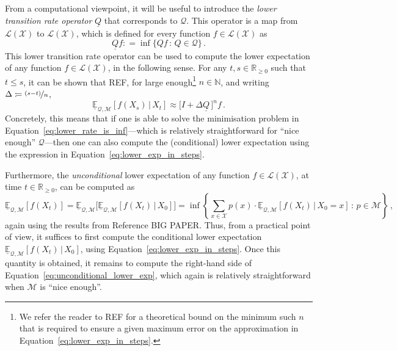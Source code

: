 \documentclass[twoside,11pt]{article}
\newcommand{\nats}{\mathbb{N}}
\newcommand{\reals}{\mathbb{R}}
\newcommand{\realsnonneg}{\reals_{\geq 0}}
\newcommand{\states}{\mathcal{X}}
\newcommand{\gambles}{\mathcal{L}}
\newcommand{\gamblesX}{\gambles(\states)}
\newcommand{\rateset}{\mathcal{Q}}
\newcommand{\lrate}{\underline{Q}}
\newcommand{\coloneqq}{:\!=}
\begin{document}
From a computational viewpoint, it will be useful to introduce the \emph{lower transition rate operator} $\lrate$ that corresponds to $\rateset$. This operator is a map from $\gamblesX$ to $\gamblesX$, which is defined for every function $f\in\gamblesX$ as
\begin{equation}\label{eq:lower_rate_is_inf}
\lrate f \coloneqq \inf\{ Qf\,:\, Q\in\rateset \}\,.
\end{equation}
This lower transition rate operator can be used to compute the lower expectation of any function $f\in\gamblesX$, in the following sense. For any $t,s\in\realsnonneg$ such that $t\leq s$, it can be shown that REF, for large enough\footnote{We refer the reader to REF for a theoretical bound on the minimum such $n$ that is required to ensure a given maximum error on the approximation in Equation~\eqref{eq:lower_exp_in_steps}.} $n\in\nats$, and writing $\Delta\coloneqq \nicefrac{(s-t)}{n}$,
\begin{equation}\label{eq:lower_exp_in_steps}
\underline{\mathbb{E}}_{\rateset,\mathcal{M}}[f(X_s)\,\vert\,X_t] \approx \bigl[I + \Delta\lrate\,\bigr]^nf\,.
\end{equation}
Concretely, this means that if one is able to solve the minimisation problem in Equation~\eqref{eq:lower_rate_is_inf}---which is relatively straightforward for ``nice enough'' $\rateset$---then one can also compute the (conditional) lower expectation using the expression in Equation~\ref{eq:lower_exp_in_steps}.

Furthermore, the \emph{unconditional} lower expectation of any function $f\in\gamblesX$, at time $t\in\realsnonneg$, can be computed as
\begin{equation}\label{eq:unconditional_lower_exp}
\underline{\mathbb{E}}_{\rateset,\mathcal{M}}[f(X_t)] = \underline{\mathbb{E}}_{\rateset,\mathcal{M}}\bigl[\underline{\mathbb{E}}_{\rateset,\mathcal{M}}[f(X_t)\,\vert\,X_0]\bigr] = \inf\left\{ \sum_{x\in\states} p(x)\cdot\underline{\mathbb{E}}_{\rateset,\mathcal{M}}[f(X_t)\,\vert\,X_0=x]\,:\,p\in\mathcal{M}  \right\}\,,
\end{equation}
again using the results from Reference BIG PAPER. Thus, from a practical point of view, it suffices to first compute the conditional lower expectation $\underline{\mathbb{E}}_{\rateset,\mathcal{M}}[f(X_t)\,\vert\,X_0]$, using Equation~\eqref{eq:lower_exp_in_steps}. Once this quantity is obtained, it remains to compute the right-hand side of Equation~\eqref{eq:unconditional_lower_exp}, which again is relatively straightforward when $\mathcal{M}$ is ``nice enough''.
\end{document}

